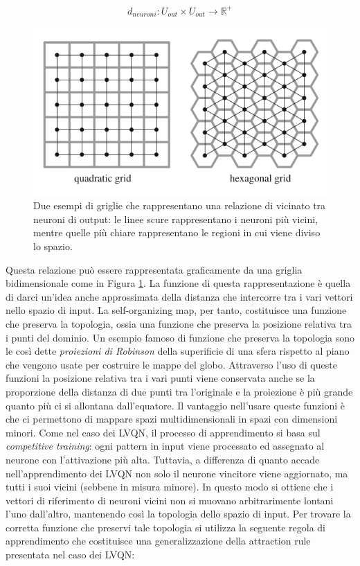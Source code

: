 \documentclass[10pt,a4paper]{article}
\begin{document}
$$
d_{neuroni} : U_{out} \times U_{out} \to \mathbb{R}^+
$$

\begin{figure}
\centering
\includegraphics[scale=0.4]{img/grid.png}
\caption{Due esempi di griglie che rappresentano una relazione di vicinato tra neuroni di output: le linee scure rappresentano i neuroni più vicini, mentre quelle più chiare rappresentano le regioni in cui viene diviso lo spazio.}
\label{fig:21}
\end{figure}


Questa relazione può essere rappresentata graficamente da una griglia bidimensionale come in Figura  \ref{fig:21}. La funzione di questa rappresentazione è quella di darci un'idea anche approssimata della distanza che intercorre tra i vari vettori nello spazio di input. La self-organizing map, per tanto, costituisce una funzione che preserva la topologia, ossia una funzione che preserva la posizione relativa tra i punti del dominio. Un esempio famoso di funzione che preserva la topologia sono le così dette \emph{proiezioni di Robinson} della superificie di una sfera rispetto al piano che vengono usate per costruire le mappe del globo. Attraverso l'uso di queste funzioni la posizione relativa tra i vari punti viene conservata anche se la proporzione della distanza di due punti tra l'originale e la proiezione è più grande quanto più ci si allontana dall'equatore. Il vantaggio nell'usare queste funzioni è che ci permettono di mappare spazi multidimensionali in spazi con dimensioni minori. Come nel caso dei LVQN, il processo di apprendimento si basa sul \emph{competitive training}: ogni pattern in input viene processato ed assegnato al neurone con l'attivazione più alta. Tuttavia, a differenza di quanto accade nell'apprendimento dei LVQN non solo il neurone vincitore viene aggiornato, ma tutti i suoi vicini (sebbene in misura minore). In questo modo si ottiene che i vettori di riferimento di neuroni vicini non si muovano arbitrarimente lontani l'uno dall'altro, mantenendo così la topologia dello spazio di input. Per trovare la corretta funzione che preservi tale topologia si utilizza la seguente regola di apprendimento che costituisce una generalizzazione della attraction rule presentata nel caso dei LVQN:
\end{document}
